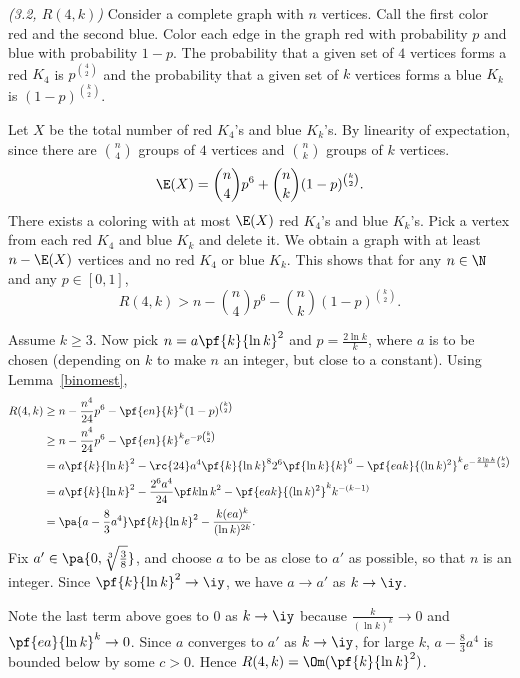 \begin{problem}{\it (3.2, $R(4,k)$)}
Consider a complete graph with $n$ vertices. Call the first color red and the second blue. Color each edge in the graph red with probability $p$ and blue with probability $1-p$. The probability that a given set of $4$ vertices forms a red $K_4$ is $p^{\binom 42}$ and the probability that a given set of $k$ vertices forms a blue $K_k$ is $(1-p)^{\binom k2}$.

Let $X$ be the total number of red $K_4$'s and blue $K_k$'s.  %
By linearity of expectation, since there are $\binom n4$ groups of $4$ vertices and $\binom nk$ groups of $k$ vertices.
\[
\E(X)= \binom n4 p^{6}+\binom nk(1-p)^{\binom k2}.
\]
There exists a coloring with at most $\E(X)$ red $K_4$'s and blue $K_k$'s. Pick a vertex from each red $K_4$ and blue $K_k$ and delete it. We obtain a graph with at least $n-\E(X)$ vertices and no red $K_4$ or blue $K_k$. This shows that for any $n\in \N$ and any $p\in [0,1]$,
\[
R(4,k)> n- \binom n4 p^{6}-\binom nk(1-p)^{\binom k2}.
\] 

Assume $k\ge 3$. Now pick $n=a\pf{k}{\ln k}^2$ and $p=\frac{2\ln k}{k}$, where $a$ is to be chosen (depending on $k$ to make $n$ an integer, but close to a constant). Using Lemma~\ref{binomest},
\begin{align*}
R(4,k)&
\ge n-\frac{n^4}{24}p^6-\pf{en}{k}^k (1-p)^{\binom k2}\\
&\ge n-\frac{n^4}{24}p^6-\pf{en}{k}^k e^{-p\binom k2}\\
&= a\pf{k}{\ln k}^2 -\rc{24} a^4\pf{k}{\ln k}^82^6\pf{\ln k}{k}^6
- \pf{eak}{(\ln k)^2}^ke^{-\frac{2\ln k}{k}\binom k2}\\
&=a\pf{k}{\ln k}^2-\frac{2^6a^4}{24}\pf k{\ln k}^2 -\pf{eak}{(\ln k)^2}^k k^{-(k-1)}\\
&=\pa{a-\frac{8}{3}a^4}\pf{k}{\ln k}^2-\frac{k(ea)^k}{(\ln k)^{2k}}.
\end{align*}
Fix $a'\in \pa{0,\sqrt[3]{\frac 38}}$, and choose $a$ to be as close to $a'$ as possible, so that $n$ is an integer. Since $\pf{k}{\ln k}^2\to \iy$, we have $a\to a'$ as $k\to \iy$.

Note the last term above goes to 0 as $k\to \iy$ because $\frac{k}{(\ln k)^k}\to 0$ and $\pf{ea}{\ln k}^k\to 0$. %
Since $a$ converges to $a'$ as $k\to \iy$, for large $k$, $a-\frac{8}{3}a^4$ is bounded below by some $c>0$. Hence $R(4,k)=\Om(\pf{k}{\ln k}^2)$.
\end{problem}
